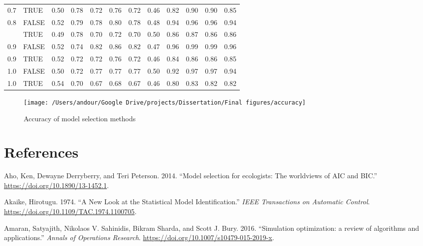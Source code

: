\documentclass[12pt,]{article}
\begin{document}
\begin{table}[!h]
{\begin{tabular}[t]{rlrrrrrrrrrr}
0.7 & TRUE & 0.50 & 0.78 & 0.72 & 0.76 & 0.72 & 0.46 & 0.82 & 0.90 & 0.90 & 0.85\\
\rowcolor{gray!6}  0.8 & FALSE & 0.52 & 0.79 & 0.78 & 0.80 & 0.78 & 0.48 & 0.94 & 0.96 & 0.96 & 0.94\\
\addlinespace
0.8 & TRUE & 0.49 & 0.78 & 0.70 & 0.72 & 0.70 & 0.50 & 0.86 & 0.87 & 0.86 & 0.86\\
\rowcolor{gray!6}  0.9 & FALSE & 0.52 & 0.74 & 0.82 & 0.86 & 0.82 & 0.47 & 0.96 & 0.99 & 0.99 & 0.96\\
0.9 & TRUE & 0.52 & 0.72 & 0.72 & 0.76 & 0.72 & 0.46 & 0.84 & 0.86 & 0.86 & 0.85\\
\rowcolor{gray!6}  1.0 & FALSE & 0.50 & 0.72 & 0.77 & 0.77 & 0.77 & 0.50 & 0.92 & 0.97 & 0.97 & 0.94\\
1.0 & TRUE & 0.54 & 0.70 & 0.67 & 0.68 & 0.67 & 0.46 & 0.80 & 0.83 & 0.82 & 0.82\\
\bottomrule
\end{tabular}}
\end{table}
\newpage

\begin{figure}

{\centering \texttt{[image: /Users/andour/Google Drive/projects/Dissertation/Final figures/accuracy]} 

}

\caption{Accuracy of model selection methods}\label{fig:accuracy}
\end{figure}

\newpage

\hypertarget{references}{%
\section*{References}\label{references}}

\hypertarget{refs}{}
\leavevmode\hypertarget{ref-Aho2014}{}%
Aho, Ken, Dewayne Derryberry, and Teri Peterson. 2014. ``Model selection for ecologists: The worldviews of AIC and BIC.'' \url{https://doi.org/10.1890/13-1452.1}.

\leavevmode\hypertarget{ref-Akaike1974}{}%
Akaike, Hirotugu. 1974. ``A New Look at the Statistical Model Identification.'' \emph{IEEE Transactions on Automatic Control}. \url{https://doi.org/10.1109/TAC.1974.1100705}.

\leavevmode\hypertarget{ref-Amaran2016}{}%
Amaran, Satyajith, Nikolaos V. Sahinidis, Bikram Sharda, and Scott J. Bury. 2016. ``Simulation optimization: a review of algorithms and applications.'' \emph{Annals of Operations Research}. \url{https://doi.org/10.1007/s10479-015-2019-x}.
\end{document}
